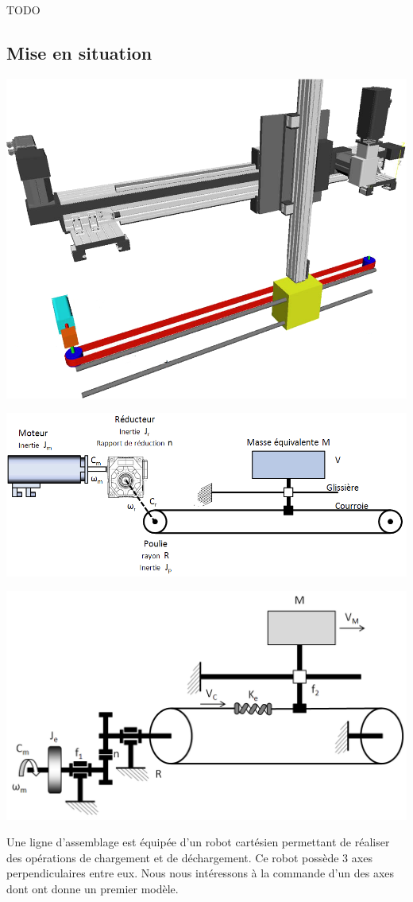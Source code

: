 \documentclass[10pt,fleqn]{article} %
\begin{document}

\vspace{10cm}
\pagestyle{fancy}
\thispagestyle{plain}


\def\columnseprulecolor{\color{ocre}}
\setlength{\columnseprule}{0.4pt} 
\ifprof
\else
\begin{multicols}{2}
\fi

\begin{obj} 
TODO
\end{obj}

\subsection*{Mise en situation}

\begin{center}
\includegraphics[width=.45\textwidth]{images/RobotCartesien}
\end{center}


\begin{center}

\includegraphics[width=.45\textwidth]{images/chaine_01}

\includegraphics[width=.45\textwidth]{images/chaine_02}
\end{center}

Une ligne d'assemblage est équipée d'un robot cartésien permettant de réaliser des opérations de chargement et de déchargement. Ce robot possède 3 axes perpendiculaires entre eux. 
Nous nous intéressons à la commande d'un des axes dont ont donne un premier modèle.


\end{multicols}
\end{document}
